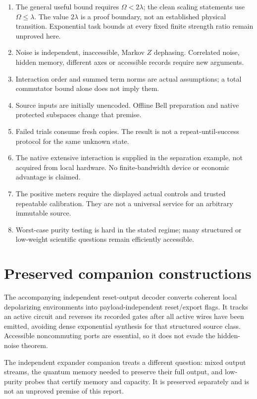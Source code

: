 \documentclass[11pt,a4paper]{article}
\begin{document}
\begin{enumerate}
\item The general useful bound requires $\Omega<2\lambda$; the clean scaling statements use $\Omega\le\lambda$. The value $2\lambda$ is a proof boundary, not an established physical transition. Exponential task bounds at every fixed finite strength ratio remain unproved here.
\item Noise is independent, inaccessible, Markov $Z$ dephasing. Correlated noise, hidden memory, different axes or accessible records require new arguments.
\item Interaction order and summed term norms are actual assumptions; a total commutator bound alone does not imply them.
\item Source inputs are initially unencoded. Offline Bell preparation and native protected subspaces change that premise.
\item Failed trials consume fresh copies. The result is not a repeat-until-success protocol for the same unknown state.
\item The native extensive interaction is supplied in the separation example, not acquired from local hardware. No finite-bandwidth device or economic advantage is claimed.
\item The positive meters require the displayed actual controls and trusted repeatable calibration. They are not a universal service for an arbitrary immutable source.
\item Worst-case purity testing is hard in the stated regime; many structured or low-weight scientific questions remain efficiently accessible.
\end{enumerate}

\section{Preserved companion constructions}
The accompanying independent reset-output decoder converts coherent local depolarizing environments into payload-independent reset/export flags. It tracks an active circuit and reverses its recorded gates after all active wires have been emitted, avoiding dense exponential synthesis for that structured source class. Accessible noncommuting ports are essential, so it does not evade the hidden-noise theorem.

The independent expander companion treats a different question: mixed output streams, the quantum memory needed to preserve their full output, and low-purity probes that certify memory and capacity. It is preserved separately and is not an unproved premise of this report.
\end{document}
